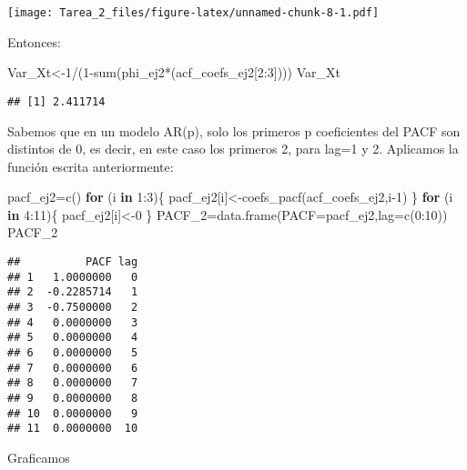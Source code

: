 \documentclass[
]{article}
\newenvironment{Shaded}{\begin{snugshade}}{\end{snugshade}}
\newcommand{\AttributeTok}[1]{\textcolor[rgb]{0.77,0.63,0.00}{#1}}
\newcommand{\ControlFlowTok}[1]{\textcolor[rgb]{0.13,0.29,0.53}{\textbf{#1}}}
\newcommand{\DecValTok}[1]{\textcolor[rgb]{0.00,0.00,0.81}{#1}}
\newcommand{\FunctionTok}[1]{\textcolor[rgb]{0.00,0.00,0.00}{#1}}
\newcommand{\NormalTok}[1]{#1}
\newcommand{\OtherTok}[1]{\textcolor[rgb]{0.56,0.35,0.01}{#1}}
\newcommand{\SpecialCharTok}[1]{\textcolor[rgb]{0.00,0.00,0.00}{#1}}
\begin{document}
\texttt{[image: Tarea\_2\_files/figure-latex/unnamed-chunk-8-1.pdf]}

Entonces:

\begin{Shaded}
\begin{Highlighting}[]
\NormalTok{Var\_Xt}\OtherTok{\textless{}{-}}\DecValTok{1}\SpecialCharTok{/}\NormalTok{(}\DecValTok{1}\SpecialCharTok{{-}}\FunctionTok{sum}\NormalTok{(phi\_ej2}\SpecialCharTok{*}\NormalTok{(acf\_coefs\_ej2[}\DecValTok{2}\SpecialCharTok{:}\DecValTok{3}\NormalTok{])))}
\NormalTok{Var\_Xt}
\end{Highlighting}
\end{Shaded}

\begin{verbatim}
## [1] 2.411714
\end{verbatim}

Sabemos que en un modelo AR(p), solo los primeros p coeficientes del
PACF son distintos de 0, es decir, en este caso los primeros 2, para
lag=1 y 2. Aplicamos la función escrita anteriormente:

\begin{Shaded}
\begin{Highlighting}[]
\NormalTok{pacf\_ej2}\OtherTok{=}\FunctionTok{c}\NormalTok{()}
\ControlFlowTok{for}\NormalTok{ (i }\ControlFlowTok{in} \DecValTok{1}\SpecialCharTok{:}\DecValTok{3}\NormalTok{)\{}
\NormalTok{  pacf\_ej2[i]}\OtherTok{\textless{}{-}}\FunctionTok{coefs\_pacf}\NormalTok{(acf\_coefs\_ej2,i}\DecValTok{{-}1}\NormalTok{)}
\NormalTok{\}}
\ControlFlowTok{for}\NormalTok{ (i }\ControlFlowTok{in} \DecValTok{4}\SpecialCharTok{:}\DecValTok{11}\NormalTok{)\{}
\NormalTok{  pacf\_ej2[i]}\OtherTok{\textless{}{-}}\DecValTok{0}
\NormalTok{\}}
\NormalTok{PACF\_2}\OtherTok{=}\FunctionTok{data.frame}\NormalTok{(}\AttributeTok{PACF=}\NormalTok{pacf\_ej2,}\AttributeTok{lag=}\FunctionTok{c}\NormalTok{(}\DecValTok{0}\SpecialCharTok{:}\DecValTok{10}\NormalTok{))}
\NormalTok{PACF\_2}
\end{Highlighting}
\end{Shaded}

\begin{verbatim}
##          PACF lag
## 1   1.0000000   0
## 2  -0.2285714   1
## 3  -0.7500000   2
## 4   0.0000000   3
## 5   0.0000000   4
## 6   0.0000000   5
## 7   0.0000000   6
## 8   0.0000000   7
## 9   0.0000000   8
## 10  0.0000000   9
## 11  0.0000000  10
\end{verbatim}

Graficamos
\end{document}
